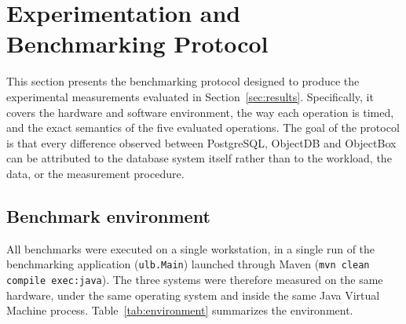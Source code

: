 \documentclass{article}
\begin{document}
\section{Experimentation and Benchmarking Protocol}
\label{sec:protocol}
This section presents the benchmarking protocol designed to produce the experimental measurements evaluated in Section~\ref{sec:results}. Specifically, it covers the hardware and software environment, the way each operation is timed, and the exact semantics of the five evaluated operations. The goal of the protocol is that every difference observed between PostgreSQL, ObjectDB and ObjectBox can be attributed to the database system itself rather than to the workload, the data, or the measurement procedure.

\subsection{Benchmark environment}
\label{subsec:environment}

All benchmarks were executed on a single workstation, in a single run of the benchmarking application (\texttt{ulb.Main}) launched through Maven (\texttt{mvn clean compile exec:java}). The three systems were therefore measured on the same hardware, under the same operating system and inside the same Java Virtual Machine process. Table~\ref{tab:environment} summarizes the environment.
\end{document}
